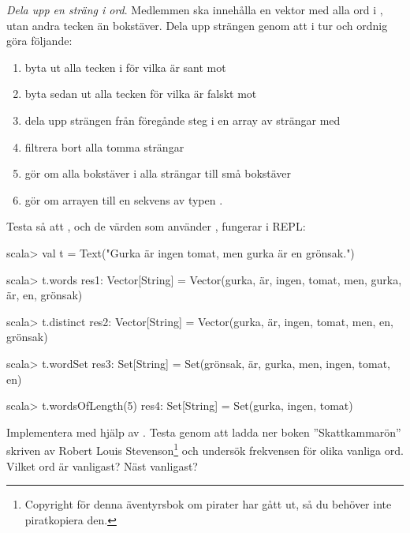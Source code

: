 \begin{figure}[H]
\end{figure}

\Task \emph{Dela upp en sträng i ord}. Medlemmen  ska innehålla en vektor med alla ord i , utan andra tecken än bokstäver. 
Dela upp strängen  genom att i tur och ordnig göra följande:
\begin{enumerate}
\item byta ut alla tecken i  för vilka  är sant mot 
\item byta sedan ut alla tecken för vilka  är falskt mot  
\item dela upp strängen från föregånde steg i en array av strängar med 
\item filtrera bort alla tomma strängar
\item gör om alla bokstäver i alla strängar till små bokstäver 
\item gör om arrayen till en sekvens av typen .
\end{enumerate}

\noindent Testa så att , och de värden som använder , fungerar i REPL:
\begin{REPL}
scala> val t = Text("Gurka är ingen tomat, men gurka är en grönsak.")

scala> t.words
res1: Vector[String] = 
  Vector(gurka, är, ingen, tomat, men, gurka, är, en, grönsak)

scala> t.distinct
res2: Vector[String] = 
  Vector(gurka, är, ingen, tomat, men, en, grönsak)

scala> t.wordSet
res3: Set[String] = Set(grönsak, är, gurka, men, ingen, tomat, en)

scala> t.wordsOfLength(5)
res4: Set[String] = Set(gurka, ingen, tomat)

\end{REPL}

\Task Implementera  med hjälp av . Testa  genom att ladda ner boken ''Skattkammarön'' skriven av Robert Louis Stevenson\footnote{Copyright för denna äventyrsbok om pirater har gått ut, så du behöver inte piratkopiera den.} och undersök frekvensen för olika vanliga ord. Vilket ord är vanligast? Näst vanligast?  

